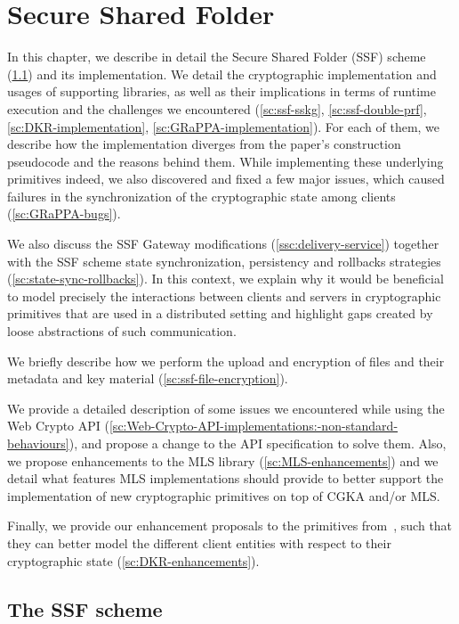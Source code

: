 \chapter{Secure Shared Folder}\label{ch:ssf}

In this chapter, we describe in detail the Secure Shared Folder (SSF) scheme (\cref{sc:SSF-scheme}) and its implementation.
We detail the cryptographic implementation and usages of supporting
libraries, as well as their implications in terms of runtime execution
and the challenges we encountered (\cref{sc:ssf-sskg}, \cref{sc:ssf-double-prf}, \cref{sc:DKR-implementation}, \cref{sc:GRaPPA-implementation}). 
For each of them, we describe how the implementation diverges from
the paper's construction pseudocode and the reasons behind them.
While implementing these underlying primitives indeed, we also discovered 
and fixed a few major issues, which caused failures in the 
synchronization of the cryptographic state among clients (\cref{sc:GRaPPA-bugs}).

We also discuss the SSF Gateway modifications 
(\cref{ssc:delivery-service})
together with the SSF scheme state synchronization, persistency and rollbacks
strategies (\cref{sc:state-sync-rollbacks}). In this context,
we explain why it would be beneficial to model precisely the
interactions between clients and servers in cryptographic
primitives that are used in a distributed setting and highlight
gaps created by loose abstractions of such communication.

We briefly describe how we perform the upload and encryption of files
and their metadata and key material (\cref{sc:ssf-file-encryption}).

We provide a detailed description of some issues we encountered
while using the Web Crypto API (\cref{sc:Web-Crypto-API-implementations:-non-standard-behaviours}),
and propose a change to the API specification to solve them.
Also, we propose enhancements to the MLS library 
(\cref{sc:MLS-enhancements}) and we detail
what features MLS implementations should provide to better support
the implementation of new cryptographic primitives on top of
CGKA and/or MLS.

Finally, we provide our enhancement proposals to the primitives
from~\cite{GKP}, 
such that they can better model the different client entities with respect
to their cryptographic state (\cref{sc:DKR-enhancements}).


\section{The SSF scheme}\label{sc:SSF-scheme}

